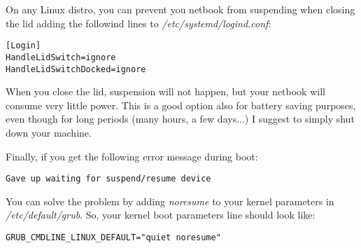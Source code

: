 \documentclass{article}
\begin{document}
On any Linux distro, you can prevent you netbook from suspending when closing the lid adding the followind lines to \emph{/etc/systemd/logind.conf}:
\begin{verbatim}
[Login]
HandleLidSwitch=ignore
HandleLidSwitchDocked=ignore
\end{verbatim}
When you close the lid, suspension will not happen, but your netbook will consume very little power. This is a good option also for battery saving purposes, even though for long periods (many hours, a few days...) I suggest to simply shut down your machine. 

Finally, if you get the following error message during boot:
\begin{verbatim}
Gave up waiting for suspend/resume device
\end{verbatim}
You can solve the problem by adding \emph{noresume} to your kernel parameters in \emph{/etc/default/grub}. So, your kernel boot parameters line should look like:
\begin{verbatim}
GRUB_CMDLINE_LINUX_DEFAULT="quiet noresume"
\end{verbatim}
\end{document}
